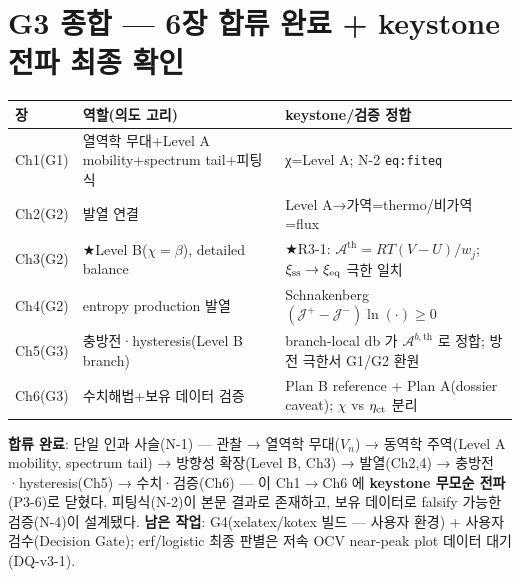 \section*{G3 종합 — 6장 합류 완료 + keystone 전파 최종 확인}
\begin{longtable}{p{} p{} p{}}
\toprule 장 & 역할(의도 고리) & keystone/검증 정합 \\ \midrule \endhead
Ch1(G1) & 열역학 무대+Level A mobility+spectrum tail+피팅식 & χ=Level A; N-2 \texttt{eq:fiteq} \\
Ch2(G2) & 발열 연결 & Level A→가역=thermo/비가역=flux \\
Ch3(G2) & ★Level B($\chi=\beta$), detailed balance & ★R3-1: $\mathcal A^\mathrm{th}=RT(V-U)/w_j$; $\xi_{\mathrm{ss}}\to\xi_{\mathrm{eq}}$ 극한 일치 \\
Ch4(G2) & entropy production 발열 & Schnakenberg $(\mathcal J^+-\mathcal J^-)\ln(\cdot)\ge0$ \\
Ch5(G3) & 충방전·hysteresis(Level B branch) & branch-local db 가 $\mathcal A^{b,\mathrm{th}}$ 로 정합; 방전 극한서 G1/G2 환원 \\
Ch6(G3) & 수치해법+보유 데이터 검증 & Plan B reference + Plan A(dossier caveat); $\chi$ vs $\eta_{\mathrm{ct}}$ 분리 \\
\bottomrule
\end{longtable}
\textbf{합류 완료}: 단일 인과 사슬(N-1) — 관찰 → 열역학 무대($V_n$) → 동역학 주역(Level A mobility,
spectrum tail) → 방향성 확장(Level B, Ch3) → 발열(Ch2,4) → 충방전·hysteresis(Ch5) → 수치·검증(Ch6) —
이 Ch1$\to$Ch6 에 \textbf{keystone 무모순 전파}(P3-6)로 닫혔다. 피팅식(N-2)이 본문 결과로 존재하고,
보유 데이터로 falsify 가능한 검증(N-4)이 설계됐다. \textbf{남은 작업}: G4(xelatex/kotex 빌드 — 사용자
환경) + 사용자 검수(Decision Gate); erf/logistic 최종 판별은 저속 OCV near-peak plot 데이터 대기(DQ-v3-1).

